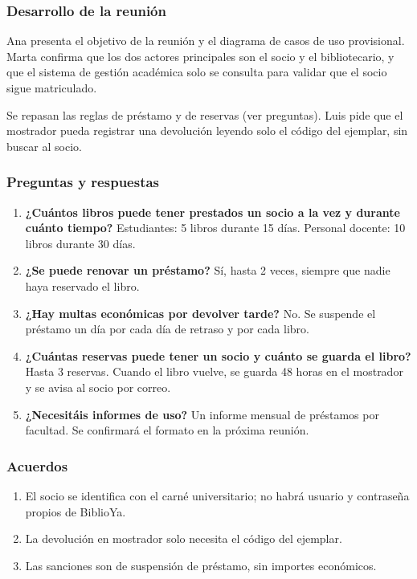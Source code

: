 \subsubsection*{Desarrollo de la reunión}

Ana presenta el objetivo de la reunión y el diagrama de casos de uso provisional. Marta confirma que los dos actores principales son el socio y el bibliotecario, y que el sistema de gestión académica solo se consulta para validar que el socio sigue matriculado.

Se repasan las reglas de préstamo y de reservas (ver preguntas). Luis pide que el mostrador pueda registrar una devolución leyendo solo el código del ejemplar, sin buscar al socio.

\subsubsection*{Preguntas y respuestas}

\begin{enumerate}
\item \textbf{¿Cuántos libros puede tener prestados un socio a la vez y durante cuánto tiempo?}
Estudiantes: 5 libros durante 15 días. Personal docente: 10 libros durante 30 días.
\item \textbf{¿Se puede renovar un préstamo?}
Sí, hasta 2 veces, siempre que nadie haya reservado el libro.
\item \textbf{¿Hay multas económicas por devolver tarde?}
No. Se suspende el préstamo un día por cada día de retraso y por cada libro.
\item \textbf{¿Cuántas reservas puede tener un socio y cuánto se guarda el libro?}
Hasta 3 reservas. Cuando el libro vuelve, se guarda 48 horas en el mostrador y se avisa al socio por correo.
\item \textbf{¿Necesitáis informes de uso?}
Un informe mensual de préstamos por facultad. Se confirmará el formato en la próxima reunión.
\end{enumerate}

\subsubsection*{Acuerdos}

\begin{enumerate}
\item El socio se identifica con el carné universitario; no habrá usuario y contraseña propios de BiblioYa.
\item La devolución en mostrador solo necesita el código del ejemplar.
\item Las sanciones son de suspensión de préstamo, sin importes económicos.
\end{enumerate}


